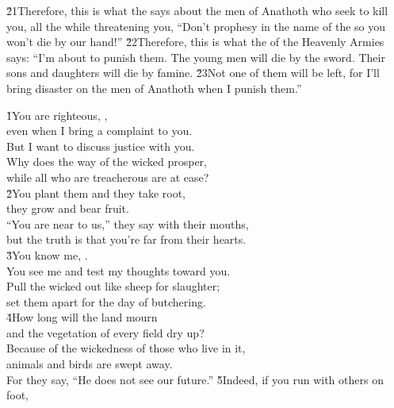 \v{21}Therefore, this is what the  says about the men of Anathoth who seek to kill you, all the while threatening you, ``Don't prophesy in the name of the  so you won't die by our hand!'' \v{22}Therefore, this is what the  of the Heavenly Armies says: ``I'm about to punish them. The young men will die by the sword. Their sons and daughters will die by famine. \v{23}Not one of them will be left, for I'll bring disaster on the men of Anathoth when I punish them.''

\begin{poetry}
\poeml {}
\v{1}You are righteous, , \\
\poeml even when I bring a complaint to you. \\
\poeml But I want to discuss justice with you. \\
\poemll    Why does the way of the wicked prosper, \\
\poemlll       while all who are treacherous are at ease? \\
\poeml \v{2}You plant them and they take root, \\
\poemll    they grow and bear fruit. \\
\poeml ``You are near to us,'' they say with their mouths, \\
\poemll    but the truth is that you're far from their hearts. \\
\poeml \v{3}You know me, . \\
\poemll    You see me and test my thoughts toward you. \\
\poeml Pull the wicked out like sheep for slaughter; \\
\poemll    set them apart for the day of butchering. \\
\poeml \v{4}How long will the land mourn \\
\poemll    and the vegetation of every field dry up? \\
\poeml Because of the wickedness of those who live in it, \\
\poemll    animals and birds are swept away. \\
\poemlll       For they say, ``He does not see our future.''
\poeml \v{5}Indeed, if you run with others on foot, \\

\end{poetry}
